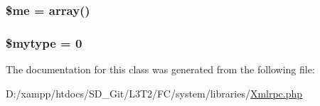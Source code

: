 \subsubsection[{\$me}]{\setlength{\rightskip}{0pt plus 5cm}\$me = array()}\label{class_x_m_l___r_p_c___values_ad856a60cee1894f180e845f9b7b81458}
\hypertarget{class_x_m_l___r_p_c___values_a49afa471d90298c2a53fb4dba2b099bf}{}
\subsubsection[{\$mytype}]{\setlength{\rightskip}{0pt plus 5cm}\$mytype = 0}\label{class_x_m_l___r_p_c___values_a49afa471d90298c2a53fb4dba2b099bf}


The documentation for this class was generated from the following file\+:\begin{DoxyCompactItemize}
\item 
D\+:/xampp/htdocs/\+S\+D\+\_\+\+Git/\+L3\+T2/\+F\+C/system/libraries/\hyperlink{_xmlrpc_8php}{Xmlrpc.\+php}\end{DoxyCompactItemize}
